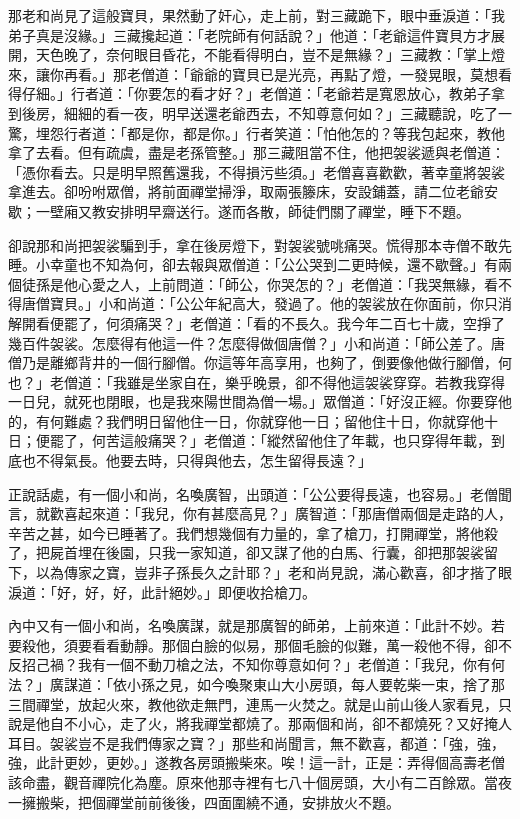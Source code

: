 那老和尚見了這般寶貝，果然動了奸心，走上前，對三藏跪下，眼中垂淚道：「我弟子真是沒緣。」三藏攙起道：「老院師有何話說？」他道：「老爺這件寶貝方才展開，天色晚了，奈何眼目昏花，不能看得明白，豈不是無緣？」三藏教：「掌上燈來，讓你再看。」那老僧道：「爺爺的寶貝已是光亮，再點了燈，一發晃眼，莫想看得仔細。」行者道：「你要怎的看才好？」老僧道：「老爺若是寬恩放心，教弟子拿到後房，細細的看一夜，明早送還老爺西去，不知尊意何如？」三藏聽說，吃了一驚，埋怨行者道：「都是你，都是你。」行者笑道：「怕他怎的？等我包起來，教他拿了去看。但有疏虞，盡是老孫管整。」那三藏阻當不住，他把袈裟遞與老僧道：「憑你看去。只是明早照舊還我，不得損污些須。」老僧喜喜歡歡，著幸童將袈裟拿進去。卻吩咐眾僧，將前面禪堂掃淨，取兩張籐床，安設鋪蓋，請二位老爺安歇；一壁廂又教安排明早齋送行。遂而各散，師徒們關了禪堂，睡下不題。

卻說那和尚把袈裟騙到手，拿在後房燈下，對袈裟號咷痛哭。慌得那本寺僧不敢先睡。小幸童也不知為何，卻去報與眾僧道：「公公哭到二更時候，還不歇聲。」有兩個徒孫是他心愛之人，上前問道：「師公，你哭怎的？」老僧道：「我哭無緣，看不得唐僧寶貝。」小和尚道：「公公年紀高大，發過了。他的袈裟放在你面前，你只消解開看便罷了，何須痛哭？」老僧道：「看的不長久。我今年二百七十歲，空掙了幾百件袈裟。怎麼得有他這一件？怎麼得做個唐僧？」小和尚道：「師公差了。唐僧乃是離鄉背井的一個行腳僧。你這等年高享用，也夠了，倒要像他做行腳僧，何也？」老僧道：「我雖是坐家自在，樂乎晚景，卻不得他這袈裟穿穿。若教我穿得一日兒，就死也閉眼，也是我來陽世間為僧一場。」眾僧道：「好沒正經。你要穿他的，有何難處？我們明日留他住一日，你就穿他一日；留他住十日，你就穿他十日；便罷了，何苦這般痛哭？」老僧道：「縱然留他住了年載，也只穿得年載，到底也不得氣長。他要去時，只得與他去，怎生留得長遠？」

正說話處，有一個小和尚，名喚廣智，出頭道：「公公要得長遠，也容易。」老僧聞言，就歡喜起來道：「我兒，你有甚麼高見？」廣智道：「那唐僧兩個是走路的人，辛苦之甚，如今已睡著了。我們想幾個有力量的，拿了槍刀，打開禪堂，將他殺了，把屍首埋在後園，只我一家知道，卻又謀了他的白馬、行囊，卻把那袈裟留下，以為傳家之寶，豈非子孫長久之計耶？」老和尚見說，滿心歡喜，卻才揩了眼淚道：「好，好，好，此計絕妙。」即便收拾槍刀。

內中又有一個小和尚，名喚廣謀，就是那廣智的師弟，上前來道：「此計不妙。若要殺他，須要看看動靜。那個白臉的似易，那個毛臉的似難，萬一殺他不得，卻不反招己禍？我有一個不動刀槍之法，不知你尊意如何？」老僧道：「我兒，你有何法？」廣謀道：「依小孫之見，如今喚聚東山大小房頭，每人要乾柴一束，捨了那三間禪堂，放起火來，教他欲走無門，連馬一火焚之。就是山前山後人家看見，只說是他自不小心，走了火，將我禪堂都燒了。那兩個和尚，卻不都燒死？又好掩人耳目。袈裟豈不是我們傳家之寶？」那些和尚聞言，無不歡喜，都道：「強，強，強，此計更妙，更妙。」遂教各房頭搬柴來。唉！這一計，正是：弄得個高壽老僧該命盡，觀音禪院化為塵。原來他那寺裡有七八十個房頭，大小有二百餘眾。當夜一擁搬柴，把個禪堂前前後後，四面圍繞不通，安排放火不題。

